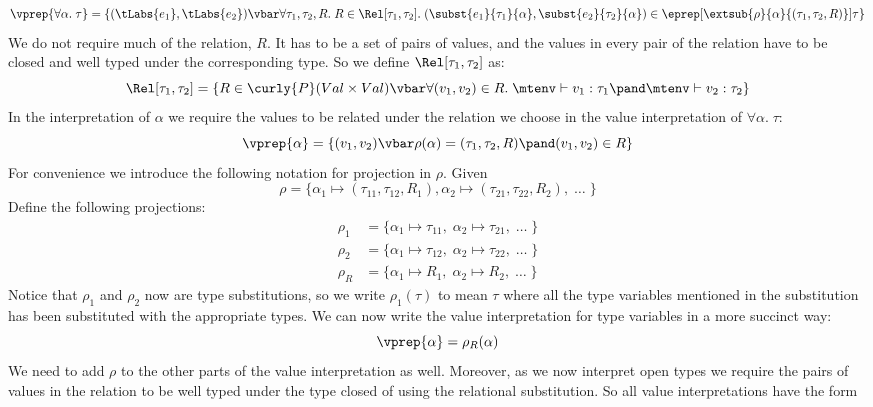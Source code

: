 \[
  \vprep{\forall \alpha.\; \tau}  = \{(\tLabs{e_1},\tLabs{e_2}) \vbar
  \forall \tau_1 , \tau_2, R. \;
    R \in \Rel[\tau_1,\tau_2].\;
      (\subst{e_1}{\tau_1}{\alpha},\subst{e_2}{\tau_2}{\alpha}) \in \eprep[\extsub{\rho}{\alpha}{(\tau_1,\tau_2,R)}]{\tau} \}
\]
We do not require much of the relation, $R$. It has to be a set of pairs of values, and the values in every pair of the relation have to be closed and well typed under the corresponding type. So we define $\Rel[\tau_1,\tau_2]$ as:
\[
\Rel[\tau_1,\tau_2] = \{R \in \curly{P}(Val \times Val) \vbar \forall (v_1,v_2) \in R. \; \mtenv \vdash v_1 : \tau_1 \pand \mtenv \vdash v_2 : \tau_2 \}
\]
In the interpretation of $\alpha$ we require the values to be related under the relation we choose in the value interpretation of $\forall \alpha. \; \tau$:
\[
  \vprep{\alpha} = \{ (v_1,v_2) \vbar \rho(\alpha) = (\tau_1,\tau_2,R) \pand (v_1,v_2) \in R \}
\]
For convenience we introduce the following notation for projection in $\rho$. Given
\[
  \rho = \{\alpha_1 \mapsto (\tau_{11},\tau_{12},R_1), \alpha_2 \mapsto (\tau_{21},\tau_{22},R_2),\; \dots\; \}
\]
Define the following projections:
\begin{align*}
  \rho_1 & = \{\alpha_1 \mapsto \tau_{11}, \; \alpha_2 \mapsto \tau_{21},\; \dots \;\} \\
  \rho_2 & = \{\alpha_1 \mapsto \tau_{12}, \; \alpha_2 \mapsto \tau_{22},\; \dots \;\} \\
  \rho_R & = \{\alpha_1 \mapsto R_1, \; \alpha_2 \mapsto R_2,\; \dots \;\}
\end{align*}
Notice that $\rho_1$ and $\rho_2$ now are type substitutions, so we write $\rho_1(\tau)$ to mean $\tau$ where all the type variables mentioned in the substitution has been substituted with the appropriate types. We can now write the value interpretation for type variables in a more succinct way:
\[
  \vprep{\alpha} = \rho_R(\alpha)
\]
We need to add $\rho$ to the other parts of the value interpretation as well. Moreover, as we now interpret open types we require the pairs of values in the relation to be well typed under the type closed of using the relational substitution. So all value interpretations have the form
